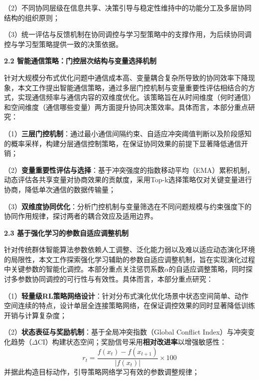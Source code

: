 \begin{titlepage}
\par
\indent
（2）不同协同层级在信息共享、决策引导与稳定性维持中的功能分工及多层协同结构的组织原则；

\par
\indent
（3）统一评估与反馈机制在协同调控与学习型策略中的支撑作用，为后续协同调控与学习型策略提供一致的决策依据。

\noindent\textbf{2.2 智能通信策略：门控层次结构与变量选择机制}

\par
\indent
针对大规模分布式优化问题中通信成本高、变量耦合复杂所导致的协同效率下降现象，本文工作提出智能通信策略，通过多层门控机制与变量重要性评估相结合的方式，实现通信频率与通信内容的双维度优化。该策略旨在从时间维度（何时通信）和空间维度（通信哪些变量）两方面提升协同决策效率。具体而言，本部分重点研究：

\par
\indent
（1）\textbf{三层门控机制}：通过最小通信间隔约束、自适应冲突阈值判断以及阶段感知的概率采样，构建分层通信控制策略，在保证协同效果的前提下显著降低通信开销；

\par
\indent
（2）\textbf{变量重要性评估与选择}：基于冲突强度的指数移动平均（EMA）累积机制，动态评估各共享变量对协商效果的贡献度，采用Top-k选择策略仅对关键变量进行协商，降低单次通信的数据传输量；

\par
\indent
（3）\textbf{双维度协同优化}：分析门控机制与变量筛选在不同问题规模与约束强度下的协同作用规律，探讨两者的耦合效应及适用边界。

\noindent\textbf{2.3 基于强化学习的参数自适应调整机制}

\par
\indent
针对传统群体智能算法参数依赖人工调整、泛化能力弱以及难以适应动态演化环境的局限性，本文工作探索强化学习辅助的参数自适应调整机制，旨在实现演化过程中关键参数的智能化调控。本部分重点关注惩罚系数$\alpha$的自适应调整策略，同时探讨多参数协同调控的可行性与有效性。具体而言，本部分重点研究：

\par
\indent
（1）\textbf{轻量级RL策略网络设计}：针对分布式演化优化场景中状态空间简单、动作空间连续的特点，设计单层全连接策略网络，在保证调控效果的同时显著降低训练开销与计算复杂度；

\par
\indent
（2）\textbf{状态表征与奖励机制}：基于全局冲突指数（Global Conflict Index）与冲突变化趋势（$\Delta$CI）构建状态空间；奖励信号采用\textbf{相对改进率}以增强敏感性：
\[
r_t=\frac{f(x_t)-f(x_{t+1})}{|f(x_t)|}\times 100
\]
并据此构造目标动作，引导策略网络学习有效的参数调整规律；


\end{titlepage}
